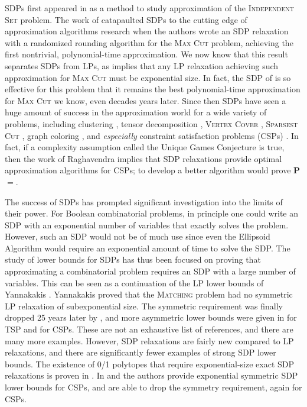 SDPs first appeared in \cite{Lovasz79} as a method to study approximation of the \textsc{Independent Set} problem. The work of \cite{GW95} catapaulted SDPs to the cutting edge of approximation algorithms research when the authors wrote an SDP relaxation with a randomized rounding algorithm for the \textsc{Max Cut} problem, achieving the first nontrivial, polynomial-time approximation. We now know that this result separates SDPs from LPs, as \cite{CLRS16} implies that any LP relaxation achieving such approximation for \textsc{Max Cut} must be exponential size. In fact, the SDP of \cite{GW95} is so effective for this problem that it remains the best polynomial-time approximation for \textsc{Max Cut} we know, even decades years later. Since then SDPs have seen a huge amount of success in the approximation world for a wide variety of problems, including clustering \cite{PW07}, tensor decomposition \cite{TS15}, \textsc{Vertex Cover} \cite{Kar09}, \textsc{Sparsest Cut} \cite{ARV09}, graph coloring \cite{Chlam07}, and \emph{especially} constraint satisfaction problems (CSPs) \cite{FJ97,HZ99,CMM09}. In fact, if a complexity assumption called the Unique Games Conjecture \cite{Khot02} is true, then the work of Raghavendra \cite{Ragh08} implies that SDP relaxations provide optimal approximation algorithms for CSPs; to develop a better algorithm would prove \textbf{P}$ = $\np. 

The success of SDPs has prompted significant investigation into the limits of their power. For Boolean combinatorial problems, in principle one could write an SDP with an exponential number of variables that exactly solves the problem. However, such an SDP would not be of much use since even the Ellipsoid Algorithm would require an exponential amount of time to solve the SDP. The study of lower bounds for SDPs has thus been focused on proving that approximating a combinatorial problem requires an SDP with a large number of variables. This can be seen as a continuation of the LP lower bounds of Yannakakis \cite{Yann88}. Yannakakis proved that the \textsc{Matching} problem had no symmetric LP relaxation of subexponential size. The symmetric requirement was finally dropped 25 years later by \cite{Roth14}, and more asymmetric lower bounds were given in \cite{FMPTHW15} for \textsc{TSP} and \cite{CLRS16} for CSPs. 
These are not an exhaustive list of references, and there are many more examples.
However, SDP relaxations are fairly new compared to LP relaxations, and there are significantly fewer examples of strong SDP lower bounds. The existence of 0/1 polytopes that require exponential-size exact SDP relaxations is proven in \cite{BDP15}. In \cite{FSP13} and \cite{LRST14} the authors provide exponential symmetric SDP lower bounds for CSPs, and \cite{LRS15} are able to drop the symmetry requirement, again for CSPs. 


